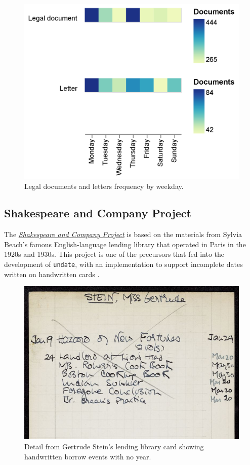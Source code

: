 \documentclass[final]{anthology-ch} %
\begin{document}
\begin{figure}[h]
  \centering
  \includegraphics[width=0.4\linewidth]{figures/pgp_letters_legaldocs_weekday.png}
  \caption{Legal documents and letters frequency by weekday. }
  \label{fig:pgp-weekday-frequency}
\end{figure}


\subsection{Shakespeare and Company
Project}\label{shakespeare-and-company-project}

The \href{https://shakespeareandco.princeton.edu/}{\textit{Shakespeare and Company
Project}} is based on the materials from Sylvia Beach's famous
English-language lending library that operated in Paris in the 1920s
and 1930s. This project is one of the precursors that fed into the development of \texttt{undate}, with
an implementation to support incomplete dates written on handwritten cards \cite{kotin_shakespeare_2022, koeser_coding_2019}.

\begin{figure}[h]
  \centering
  \includegraphics[width=0.7\linewidth]{figures/stein_lendingcard_unknownyear.jpg}
  \caption{Detail from Gertrude Stein's lending library card showing handwritten borrow events with no year. \cite{stein_beachpapers_pul, noauthor_gertrude_nodate} }
  \label{fig:stein-lending-card}
\end{figure}
\end{document}
